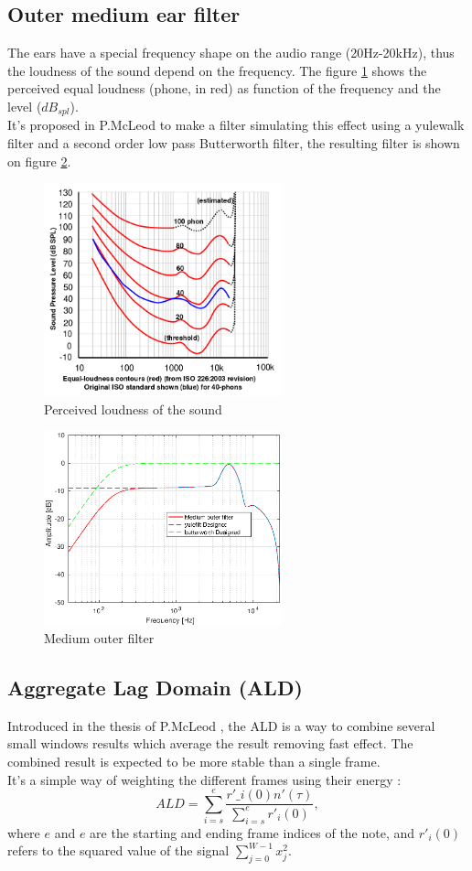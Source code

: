 \documentclass[twoside,twocolumn]{report}
\begin{document}
\subsection{Outer medium ear filter }
The ears have a special frequency shape on the audio range (20Hz-20kHz), thus the loudness of the sound depend on the frequency. The figure \ref{loud} shows the perceived equal loudness (phone, in red) as function of the frequency and the level ($dB_{spl}$).\\
It's proposed in P.McLeod to make a filter simulating this effect using a yulewalk filter and a second order low pass Butterworth filter, the resulting filter is shown on figure \ref{mdouterfilt}.
\begin{figure}[h!]
	\centering
	\includegraphics[width=260px]{./images/loudness.png}
	\caption{Perceived loudness of the sound}
	\label{loud}
\end{figure}
\begin{figure}[h!]
	\centering
	\includegraphics[width=260px]{./images/mdouterfilt.eps}
	\caption{Medium outer filter }
	\label{mdouterfilt}
\end{figure}
\subsection{Aggregate Lag Domain (ALD) }
Introduced in the thesis of P.McLeod \cite{mcleod2009fast}, the ALD is a way to combine several small windows results which average the result removing fast effect. The combined result is expected to be more stable than a single frame. \\
It's a simple way of weighting the different frames using their energy :
\begin{equation}
ALD = \sum_{i=s}^{e} \frac{r'\_i(0) n'(\tau)}{\sum_{i=s}^{e}r'_i(0)},
\end{equation} 
where $e$  and $ e$ are the starting and ending frame indices of the note, and $r'_i(0)$ refers to the squared value of the signal $\sum_{j=0}^{W-1}x^2_j$.
\end{document}
